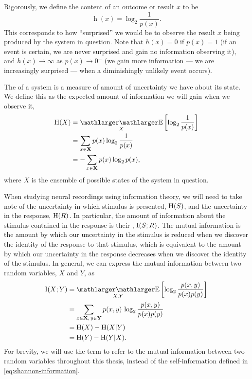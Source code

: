 Rigorously, we define the  content of an outcome or result $x$ to be
\begin{equation}
\label{eq:shannon-information}
\operatorname{h}(x) = \log_2 \frac{1}{p(x)}
.\end{equation}
This corresponds to how ``surprised'' we would be to observe the result $x$ being produced by the system in question.
Note that $h(x)=0$ if $p(x)=1$ (if an event is certain, we are never surprised and gain no information observing it), and $h(x) \to \infty$ as $p(x) \to 0^+$ (we gain more information --- we are increasingly surprised --- when a diminishingly unlikely event occurs).

The  of a system is a measure of amount of uncertainty we have about its state.
We define this as the expected amount of information we will gain when we observe it,
\begin{align}
\HH( X )
  &= \EE_X \left[ \log_2 \frac{1}{p(x)} \right] \notag
\\&= \sum_{x \in \SET{X}} p(x) \log_2 \frac{1}{p(x)} \notag
\\&= - \sum_{x \in \SET{X}} p(x) \log_2 p(x)
,\end{align}
where $X$ is the ensemble of possible states of the system in question.

When studying neural recordings using information theory, we will need to take note of the uncertainty in which stimulus is presented, $\operatorname{H}(S)$, and the uncertainty in the response, $\operatorname{H}(R)$.
In particular, the amount of information about the stimulus contained in the response is their , $\operatorname{I}(S;R)$.
The mutual information is the amount by which our uncertainty in the stimulus is reduced when we discover the identity of the response to that stimulus, which is equivalent to the amount by which our uncertainty in the response decreases when we discover the identity of the stimulus.
In general, we can express the mutual information between two random variables, $X$ and $Y$, as
\begin{align}
\I(X;Y)
  &= \EE_{X, Y} \left[ \log_2 \frac{p(x,y)}{p(x)p(y)} \right] \notag
\\&= \sum_{x \in \SET{X}, \, y \in \SET{Y}} p(x,y) \, \log_2 \frac{p(x,y)}{p(x)p(y)} \notag
\\&= \HH(X) - \HH(X | Y) \notag
\\&= \HH(Y) - \HH(Y | X) \label{eq:info}
.\end{align}
For brevity, we will use the term  to refer to the mutual information between two random variables throughout this thesis, instead of the self-information defined in \autoref{eq:shannon-information}.

